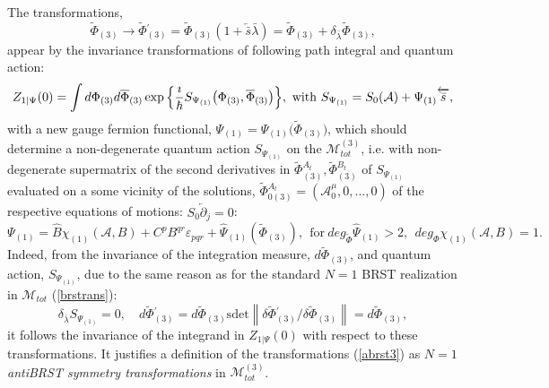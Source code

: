 \documentclass[10pt]{article}
\begin{document}
The  transformations,
\begin{equation}\label{abrst3}
\widetilde{\Phi}_{(3)} \to \widetilde{\Phi}{}^{\prime}_{(3)} = \widetilde{\Phi}_{(3)}(1+\overleftarrow{\bar{s}} \bar{\lambda}) =\widetilde{\Phi}_{(3)}+\delta_{\bar{\lambda}} \widetilde{\Phi}_{(3)},
\end{equation}
  appear by the  invariance transformations of  following path integral and quantum action:
 \begin{eqnarray}
\label{Pintlocn1}
  &\hspace{-1em}& {Z}_{1|\Psi}(0) =  \int  d \Phi_{(3)} d \overline{\Phi}_{(3)}  \exp \Big\{\frac{\imath}{\hbar}S_{\Psi_{(1)}}\big(\Phi_{(3)}, \overline{\Phi}_{(3)}\big)\Big\}, \ \mathrm{with}  \ S_{\Psi_{(1)}}  = S_0(\mathcal{A}) +%
\Psi_{(1)}\overleftarrow{\bar{s}},
   \end{eqnarray}
with a new gauge fermion functional, $\Psi_{(1)}=\Psi_{(1)}\big(\widetilde{\Phi}_{(3)}\big)$, which should determine a non-degenerate  quantum action $S_{\Psi_{(1)}}$ on the $\mathcal{M}_{tot}^{(3)}$, i.e. with non-degenerate supermatrix of the second derivatives  in $\widetilde{\Phi}{}^{A_t}_{(3)}, \widetilde{\Phi}{}^{B_t}_{(3)}$ of $S_{\Psi_{(1)}}$ evaluated on a some vicinity of the solutions, $\widetilde{\Phi}{}^{A_t}_{0(3)} = (\mathcal{A}^\mu_0,0,...,0)$  of the respective  equations of motions: $S_0 \overleftarrow{\partial}_j=0$:
\begin{equation}\label{aN1gaugef}
  \Psi_{(1)} = \widehat{B}\chi_{(1)}(\mathcal{A},B)  +  C^pB^{qr}\varepsilon_{pqr}  + \widehat{\Psi}_{(1)}(\widetilde{\Phi}_{(3)}), \   \ \mathrm{for} \ deg_{\widetilde{\Phi}}\widehat{\Psi}_{(1)}>2, \ \ deg_{\Phi}{} \chi_{(1)}(\mathcal{A},B) = 1.
\end{equation}
Indeed,  from the invariance of the integration measure,  $d \widetilde{\Phi}_{(3)}$, and  quantum action, $S_{\Psi_{(1)}}$,   due to the same reason as for the standard $N=1$ BRST realization in $\mathcal{M}_{tot}$ (\ref{brstrans}):
 \begin{equation}\label{abrstrans}
   \delta_{\bar{\lambda}}S_{\Psi_{(1)}} =0, \quad  d \widetilde{\Phi}{}^{\prime}_{(3)}=d \widetilde{\Phi}_{(3)}\mathrm{sdet}\left \| \delta\widetilde{\Phi}{}^{\prime}_{(3)}/  \delta\widetilde{\Phi}_{(3)} \right \| =d \widetilde{\Phi}_{(3)},
\end{equation}
it follows  the invariance of the integrand in $Z_{1|\Psi}(0) $ with respect to these transformations.
It justifies a definition of  the transformations (\ref{abrst3}) as $N=1$ \emph{antiBRST symmetry transformations} in $\mathcal{M}^{(3)}_{tot}$.
\end{document}
